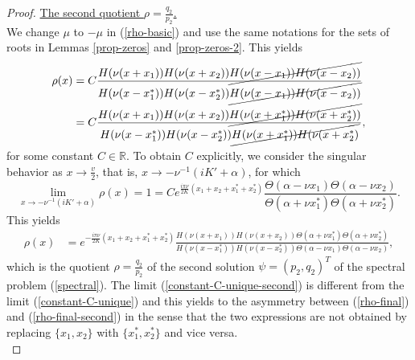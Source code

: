 \documentclass[12pt,reqno]{amsart}
\numberwithin{equation}{section}
\newcommand{\R}{\mathbb{R}}
\begin{document}
\begin{proof}
\underline{The second quotient $\rho = \frac{q_2}{p_2}$.} \\
We change $\mu$ to $-\mu$ in (\ref{rho-basic}) and use the same notations for the sets of roots in Lemmas \ref{prop-zeros} and \ref{prop-zeros-2}. This yields
\begin{align}
\rho(x) &= C
\frac{H(\nu (x+x_1)) H(\nu (x+x_2)) 
	\cancel{H(\nu (x-x_1)) H(\nu (x-x_2))}}{H(\nu (x-x_1^*)) H(\nu (x-x_2^*)) 
	\cancel{H(\nu (x-x_1)) H(\nu (x-x_2))}} \notag \\
&= C \frac{H(\nu (x+x_1)) H(\nu (x+x_2)) 
\cancel{H(\nu (x+x_1^*)) H(\nu (x+x_2^*))}}{H(\nu (x-x_1^*)) H(\nu (x-x_2^*)) 
\cancel{H(\nu (x+x_1^*)) H(\nu (x+x_2^*)}}, \label{rho-second}
\end{align} 
for some constant $C \in \R$. To obtain $C$ explicitly, we consider the singular behavior as $x \to \frac{v}{2}$, that is, $x \to -\nu^{-1} (iK'+\alpha)$, for which 
\begin{equation}
\label{constant-C-unique-second}
\lim_{x \to -\nu^{-1} (iK'+\alpha)} \rho(x) = 1 = C e^{\frac{i\pi \nu}{2K}  (x_1 + x_2 + x_1^* + x_2^*)} \frac{\Theta(\alpha - \nu x_1) \Theta(\alpha - \nu x_2)}{\Theta(\alpha + \nu x_1^*) \Theta(\alpha + \nu x_2^*)}.
\end{equation}
This yields 
\begin{align}
\rho(x) &= e^{-\frac{i\pi \nu }{2K}  (x_1 + x_2 + x_1^* + x_2^*)} 
\frac{H(\nu (x+ x_1)) H(\nu (x+ x_2))\Theta(\alpha + \nu x_1^*) \Theta(\alpha + \nu x_2^*)}{H(\nu (x - x_1^*)) H(\nu (x - x_2^*)) \Theta(\alpha - \nu x_1) \Theta(\alpha - \nu x_2)}, 
\label{rho-final-second}
\end{align} 
which is the quotient $\rho = \frac{q_2}{p_2}$ of the second solution $\psi = (p_2,q_2)^T$ of the spectral problem (\ref{spectral}). The limit (\ref{constant-C-unique-second}) is different from the limit (\ref{constant-C-unique}) and this yields to the asymmetry between (\ref{rho-final}) and (\ref{rho-final-second}) in the sense that the two expressions are not obtained by replacing $\{x_1,x_2\}$ with $\{x_1^*,x_2^*\}$ and vice versa. \\


\end{proof}
\end{document}
